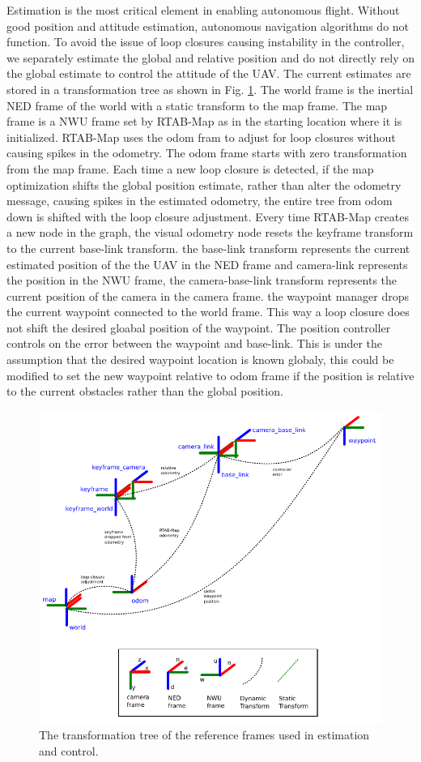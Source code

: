\documentclass[letterpaper, 10 pt, conference]{ieeeconf}  %
\begin{document}
Estimation is the most critical element in enabling autonomous flight. Without good position and attitude estimation, autonomous navigation algorithms do not function. To avoid the issue of loop closures causing instability in the controller, we separately estimate the global and relative position and do not directly rely on the global estimate to control the attitude of the UAV. The current estimates are stored in a transformation tree as shown in Fig. \ref{fig:tf_tree}. The world frame is the inertial NED frame of the world with a static transform to the map frame. The map frame is a NWU frame set by RTAB-Map as in the starting location where it is initialized. RTAB-Map uses the odom fram to adjust for loop closures without causing spikes in the odometry. The odom frame starts with zero transformation from the map frame. Each time a new loop closure is detected, if the map optimization shifts the global position estimate, rather than alter the odometry message, causing spikes in the estimated odometry, the entire tree from odom down is shifted with the loop closure adjustment. Every time RTAB-Map creates a new node in the graph, the visual odometry node resets the keyframe transform to the current base-link transform. the base-link transform represents the current estimated position of the the UAV in the NED frame and camera-link represents the position in the NWU frame, the camera-base-link transform represents the current position of the camera in the camera frame. the waypoint manager drops the current waypoint connected to the world frame. This way a loop closure does not shift the desired gloabal position of the waypoint. The position controller controls on the error between the waypoint and base-link. This is under the assumption that the desired waypoint location is known globaly, this could be modified to set the new waypoint relative to odom frame if the position is relative to the current obstacles rather than the global position.

\begin{figure}
\centering
\includegraphics[width=0.9\linewidth]{tf_tree_relative_rtab}
\caption{The transformation tree of the reference frames used in estimation and control.}
\label{fig:tf_tree}
\end{figure}
\end{document}
